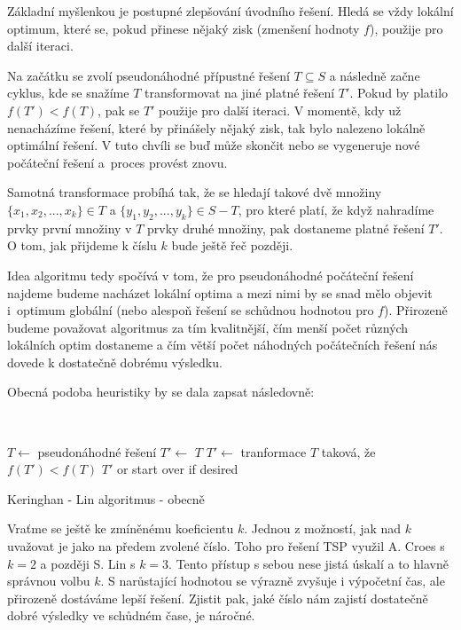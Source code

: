\documentclass[
  biblatex,
  figures=false,
  glossaries,
  index
]{kidiplom}
\begin{document}
Základní myšlenkou je postupné zlepšování úvodního řešení. Hledá se vždy lokální optimum, které se, pokud přinese nějaký zisk (zmenšení hodnoty $f$), použije pro další iteraci.

Na začátku se zvolí pseudonáhodné přípustné řešení $T \subseteq S$ a následně začne cyklus, kde se snažíme $T$ transformovat na jiné platné řešení $T'$. Pokud by platilo $f(T') < f(T)$, pak se $T'$ použije pro další iteraci. V momentě, kdy už nenacházíme řešení, které by přinášely nějaký zisk, tak bylo nalezeno lokálně optimální řešení. V tuto chvíli se buď může skončit nebo se vygeneruje nové počáteční řešení a~proces provést znovu.

\sloppy Samotná transformace probíhá tak, že se hledají takové dvě množiny $\{{x_1, x_2, ..., x_k\} \in T}$ a $\{y_1, y_2, ..., y_k\} \in S - T$, pro které platí, že když nahradíme prvky první množiny v $T$ prvky druhé množiny, pak dostaneme platné řešení $T'$. O tom, jak přijdeme k číslu $k$ bude ještě řeč později.

Idea algoritmu tedy spočívá v tom, že pro pseudonáhodné počáteční řešení najdeme budeme nacházet lokální optima a mezi nimi by se snad mělo objevit i~optimum globální (nebo alespoň řešení se schůdnou hodnotou pro $f$). Přirozeně budeme považovat algoritmus za tím kvalitnější, čím menší počet různých lokálních optim dostaneme a čím větší počet náhodných počátečních řešení nás dovede k dostatečně dobrému výsledku.

Obecná podoba heuristiky by se dala zapsat následovně:\newline


{\LinesNumbered\SetAlgoNoLine\
\begin{algorithm}[H]
$T \leftarrow$ pseudonáhodné řešení\;
$T' \leftarrow$ $T$\;
{
	$T' \leftarrow$ tranformace $T$ taková, že $f(T') < f(T)$\;
}
\Return $T'$ or start over if desired\;
\caption{Keringhan - Lin algoritmus - obecně}
\end{algorithm}
}\leavevmode\newline

Vraťme se ještě ke zmíněnému koeficientu $k$. Jednou z možností, jak nad $k$ uvažovat je jako na předem zvolené číslo. Toho pro řešení TSP využil A. Croes s $k = 2$ a později S. Lin s $k = 3$. Tento přístup s sebou nese jistá úskalí a to hlavně správnou volbu $k$. S narůstající hodnotou se výrazně zvyšuje i výpočetní čas, ale přirozeně dostáváme lepší řešení. Zjistit pak, jaké číslo nám zajistí dostatečně dobré výsledky ve schůdném čase, je náročné.
\end{document}
